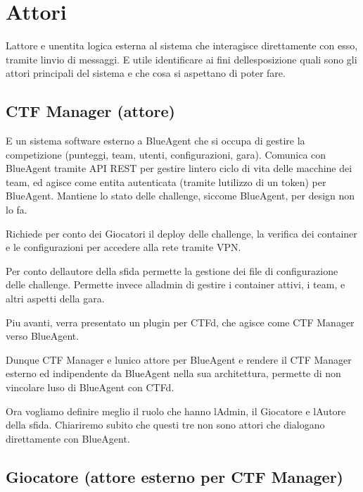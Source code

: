 \section{Attori}\label{attori}

L\textquotesingle attore e\textquotesingle{} un\textquotesingle entita
logica esterna al sistema che interagisce direttamente con esso, tramite
l\textquotesingle invio di messaggi. E\textquotesingle{} utile
identificare ai fini dell\textquotesingle esposizione quali sono gli
attori principali del sistema e che cosa si aspettano di poter fare.

\subsection{CTF Manager (attore)}\label{ctf-manager-attore}

E\textquotesingle{} un sistema software esterno a BlueAgent che si
occupa di gestire la competizione (punteggi, team, utenti,
configurazioni, gara). Comunica con BlueAgent tramite API REST per
gestire l\textquotesingle intero ciclo di vita delle macchine dei team,
ed agisce come entita autenticata (tramite l\textquotesingle utilizzo di
un token) per BlueAgent. Mantiene lo stato delle challenge, siccome
BlueAgent, per design non lo fa.

Richiede per conto dei Giocatori il deploy delle challenge, la verifica
dei container e le configurazioni per accedere alla rete tramite VPN.

Per conto dell\textquotesingle autore della sfida permette la gestione
dei file di configurazione delle challenge. Permette invece
all\textquotesingle admin di gestire i container attivi, i team, e altri
aspetti della gara.

Piu avanti, verra presentato un plugin per CTFd, che agisce come CTF
Manager verso BlueAgent.

Dunque CTF Manager e\textquotesingle{} l\textquotesingle unico attore
per BlueAgent e rendere il CTF Manager esterno ed indipendente da
BlueAgent nella sua architettura, permette di non vincolare
l\textquotesingle uso di BlueAgent con CTFd.

Ora vogliamo definire meglio il ruolo che hanno l\textquotesingle Admin,
il Giocatore e l\textquotesingle Autore della sfida. Chiariremo subito
che questi tre non sono attori che dialogano direttamente con BlueAgent.

\subsection{Giocatore (attore esterno per CTF
Manager)}\label{giocatore-attore-esterno-per-ctf-manager}

